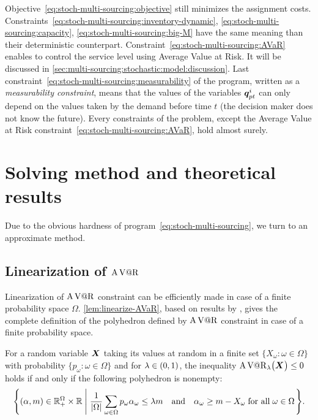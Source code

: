 Objective~\eqref{eq:stoch-multi-sourcing:objective} still minimizes the assignment costs.
Constraints~\eqref{eq:stoch-multi-sourcing:inventory-dynamic}, \eqref{eq:stoch-multi-sourcing:capacity}, \eqref{eq:stoch-multi-sourcing:big-M} have the same meaning than their deterministic counterpart.
Constraint~\eqref{eq:stoch-multi-sourcing:AVaR} enables to control the service level using Average Value at Risk.
It will be discussed in \cref{sec:multi-sourcing:stochastic:model:discussion}.
Last constraint~\eqref{eq:stoch-multi-sourcing:measurability} of the program, written as a {\em measurability constraint}, means that the values of the variables $\va\quantity_{pt}^i$ can only depend on the values taken by the demand before time $t$ (the decision maker does not know the future).
Every constraints of the problem, except the Average Value at Risk constraint~\eqref{eq:stoch-multi-sourcing:AVaR}, hold almost surely.




\section{Solving method and theoretical results}
\label{sec:multi-sourcing:stochastic:solving-method}


Due to the obvious hardness of program~\eqref{eq:stoch-multi-sourcing}, we turn to an approximate method.


\subsection{Linearization of $\operatorname{A\operatorname{V@R}}$}
\label{sec:multi-sourcing:stochastic:avar-linearization}


Linearization of $\operatorname{A\operatorname{V@R}}$ constraint can be efficiently made in case of a finite probability space $\Omega$.
\cref{lem:linearize-AVaR}, based on results by \cite{Rockafellar2000}, gives the complete definition of the polyhedron defined by $\operatorname{A\operatorname{V@R}}$ constraint in case of a finite probability space.


\begin{lem}\label{lem:linearize-AVaR}
For a random variable $\va X$ taking its values at random in a finite set $\{X_{\omega}\colon\omega\in\Omega\}$ with probability $\{p_{\omega}\colon\omega\in\Omega\}$ and for $\lambda\in\bracket{0,1}$, the inequality 
$\AVaR_{\lambda}\bracket{\va X} \le 0$ holds if and only if the following polyhedron is nonempty:
$$
\left\{
\bracket{\alpha,m}\in\RR_+^{\Omega}\times\RR
\;\left|\;
\frac{1}{\card{\Omega}}\sum_{\omega\in\Omega}p_{\omega}\alpha_{\omega}\leq \lambda m
\quad\mbox{\textup{and}}\quad
\alpha_{\omega}\geq m-X_{\omega}\;
\mbox{\textup{for all}}\;\omega\in\Omega
\right.
\right\}.
$$
\end{lem}


